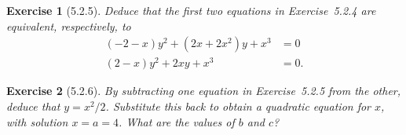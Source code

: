 \documentclass[12pt]{article}
\theoremstyle{plain}
\newtheorem{ex}{Exercise}
\begin{document}
\begin{ex} [5.2.5]
  Deduce that the first two equations in Exercise~5.2.4 are equivalent, respectively, to
  \begin{align*}
    (-2-x)y^2+(2x+2x^2)y+x^3  &= 0 \\
    (2-x)y^2+2xy+x^3          &= 0.
  \end{align*}
\end{ex}

\begin{ex} [5.2.6]
  By subtracting one equation in Exercise~5.2.5 from the other, deduce that $y=x^2/2$. Substitute this back to obtain a quadratic equation for $x$, with solution $x=a=4$. What are the values of $b$ and $c$?
\end{ex}
\end{document}
